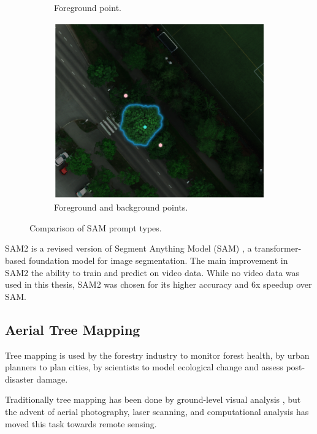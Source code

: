 \documentclass[english, 12pt, a4paper, sci, utf8, a-2b, online]{aaltothesis}
\begin{document}
\begin{figure}[h]
\begin{subfigure}[t]{0.32\textwidth}
        \caption{Foreground point.}
    \end{subfigure}
    \begin{subfigure}[t]{0.32\textwidth}
        \includegraphics[width=1.0\textwidth]{figures/sam-prompts/point-background.png}
        \caption{Foreground and background points.}
    \end{subfigure}
    \caption{Comparison of SAM prompt types.}
    \label{fig:sam-prompts}
\end{figure}


SAM2 is a revised version of Segment Anything Model (SAM) \cite{sam}, a transformer-based foundation model for image segmentation. The main improvement in SAM2 the ability to train and predict on video data. While no video data was used in this thesis, SAM2 was chosen for its higher accuracy and 6x speedup over SAM.

\subsection{Aerial Tree Mapping}

Tree mapping is used by the forestry industry to monitor forest health, by urban planners to plan cities, by scientists to model ecological change and assess post-disaster damage.

Traditionally tree mapping has been done by ground-level visual analysis \cite{aerial-photography}, but the advent of aerial photography, laser scanning, and computational analysis has moved this task towards remote sensing.
\end{document}
